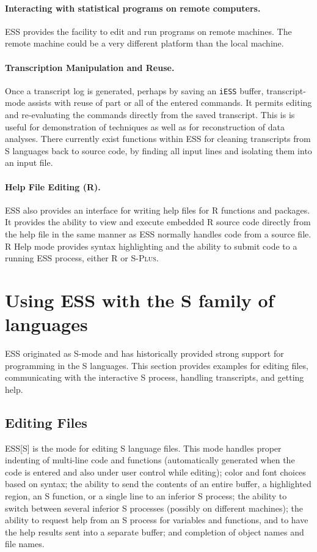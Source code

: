 \documentclass{article}
\newcommand*{\Splus}{\textsc{S-Plus}}
\newcommand{\stexttt}[1]{{\small\texttt{#1}}}
\begin{document}
\paragraph{Interacting with statistical programs on remote computers.}
ESS provides the facility to edit and run programs on remote machines.
The remote machine could be a very different platform than the local
machine.

\paragraph{Transcription Manipulation and Reuse.}
Once a transcript log is generated, perhaps by saving an
\stexttt{iESS} buffer, transcript-mode assists with reuse of part or
all of the entered commands.  It permits editing and re-evaluating the
commands directly from the saved transcript.  This is is useful for
demonstration of techniques as well as for reconstruction of data
analyses.  There currently exist functions within ESS for cleaning
transcripts from S languages back to source code, by finding all input
lines and isolating them into an input file.

\paragraph{Help File Editing (R).}
ESS also provides an interface for writing help files for R functions
and packages.  It provides the ability to view and execute embedded R
source code directly from the help file in the same manner as ESS
normally handles code from a source file.  R Help mode provides syntax
highlighting and the ability to submit code to a running ESS
process, either R or \Splus.

\section{Using ESS with the S family of languages}
\label{sec:S}

ESS originated as S-mode and has historically provided strong support for
programming in the S languages.  This section provides examples for
editing files, communicating with the interactive S process, handling
transcripts, and getting help.

\subsection{Editing Files}
\label{sec:S:edit}

ESS[S] is the mode for editing S language files.  This mode handles
proper indenting of multi-line code and functions (automatically
generated when the code is entered and also under user control while editing);
color and font choices based on syntax; the
ability to send the contents of an entire buffer, a highlighted
region, an S function, or a single line to an inferior S process;
the ability to switch between several inferior S processes
(possibly on different machines); the ability to
request help from an S process for variables and functions, and to
have the help results sent into a separate buffer; and completion of object
names and file names.
\end{document}
